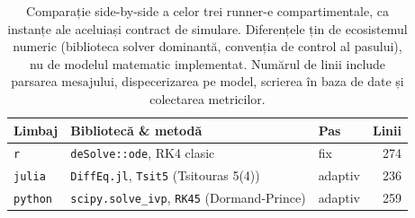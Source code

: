 \begin{table}[!htbp]
\centering
\caption[Comparație runner-e compartimentale]{Comparație side-by-side a celor trei runner-e compartimentale, ca
instanțe ale aceluiași contract de simulare. Diferențele țin de ecosistemul
numeric (biblioteca solver dominantă, convenția de control al pasului), nu de
modelul matematic implementat. Numărul de linii include parsarea mesajului,
dispecerizarea pe model, scrierea în baza de date și colectarea metricilor.}
\label{tab:implementari_runners}
\small
\begin{tabularx}{\columnwidth}{l X l r}
\toprule
\textbf{Limbaj} & \textbf{Bibliotecă \& metodă} & \textbf{Pas} & \textbf{Linii} \\
\midrule
\texttt{r}      & \texttt{deSolve::ode}, RK4 clasic                                  & fix     & 274 \\
\texttt{julia}  & \texttt{DiffEq.jl}, \texttt{Tsit5} (Tsitouras 5(4))                & adaptiv & 236 \\
\texttt{python} & \texttt{scipy.solve\_ivp}, \texttt{RK45} (Dormand-Prince)          & adaptiv & 259 \\
\bottomrule
\end{tabularx}
\end{table}
